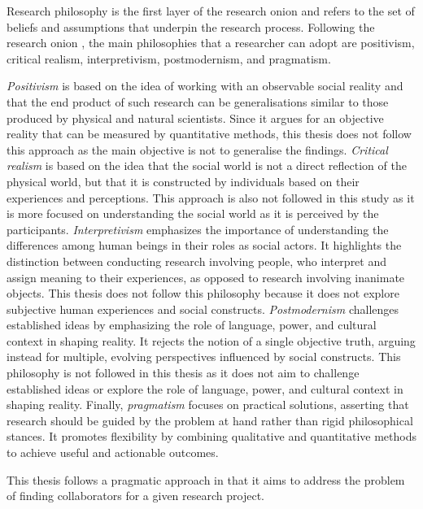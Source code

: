 Research philosophy is the first layer of the research onion and refers to the set of beliefs and assumptions that underpin the research process.
Following the research onion \cite{SaundersMark2023}, the main philosophies that a researcher can adopt are positivism, critical realism, interpretivism, postmodernism, and pragmatism.

\textit{Positivism} is based on the idea of working with an observable social reality and that the end product of such research can be generalisations similar to those produced by physical and natural scientists.
Since it argues for an objective reality that can be measured by quantitative methods, this thesis does not follow this approach as the main objective is not to generalise the findings.
\textit{Critical realism} is based on the idea that the social world is not a direct reflection of the physical world, but that it is constructed by individuals based on their experiences and perceptions.
This approach is also not followed in this study as it is more focused on understanding the social world as it is perceived by the participants.
\textit{Interpretivism} emphasizes the importance of understanding the differences among human beings in their roles as social actors.
It highlights the distinction between conducting research involving people, who interpret and assign meaning to their experiences, as opposed to research involving inanimate objects.
This thesis does not follow this philosophy because it does not explore subjective human experiences and social constructs.
\textit{Postmodernism} challenges established ideas by emphasizing the role of language, power, and cultural context in shaping reality.
It rejects the notion of a single objective truth, arguing instead for multiple, evolving perspectives influenced by social constructs.
This philosophy is not followed in this thesis as it does not aim to challenge established ideas or explore the role of language, power, and cultural context in shaping reality.
Finally, \textit{pragmatism} focuses on practical solutions, asserting that research should be guided by the problem at hand rather than rigid philosophical stances.
It promotes flexibility by combining qualitative and quantitative methods to achieve useful and actionable outcomes.

This thesis follows a pragmatic approach in that it aims to address the problem of finding collaborators for a given research project.